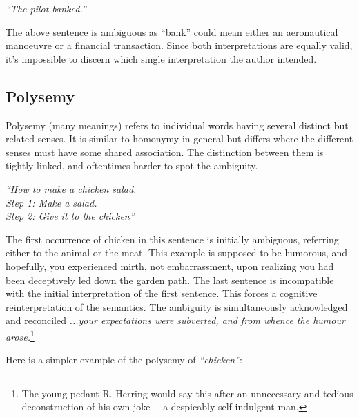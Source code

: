 \begin{center}
	\textit{``The pilot banked.''}
\end{center}


The above sentence is ambiguous as ``bank'' could mean either an aeronautical manoeuvre or a financial transaction. Since both interpretations are equally valid, it's impossible to discern which single interpretation the author intended.


\subsection{Polysemy}
Polysemy (many meanings) refers to individual words having several distinct but related senses. It is similar to homonymy in general but differs where the different senses must have some shared association. The distinction between them is tightly linked, and oftentimes harder to spot the ambiguity.

\begin{center}
	\textit{``How to make a chicken salad. \\ Step 1: Make a salad. \\ Step 2: Give it to the chicken''}
\end{center}

The first occurrence of chicken in this sentence is initially ambiguous, referring either to the animal or the meat. This example is supposed to be humorous, and hopefully, you experienced mirth, not embarrassment, upon realizing you had been deceptively led down the garden path. The last sentence is incompatible with the initial interpretation of the first sentence. This forces a cognitive reinterpretation of the semantics. The ambiguity is simultaneously acknowledged and reconciled \textit{...your expectations were subverted, and from whence the humour arose.}\footnote{The young pedant R. Herring would say this after an unnecessary and tedious deconstruction of his own joke--- a despicably self-indulgent man.} %

Here is a simpler example of the polysemy of \textit{``chicken''}:

